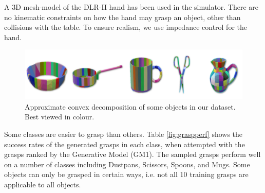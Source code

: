 A 3D mesh-model of the DLR-II hand has been used in the simulator. There are no kinematic constraints on how the hand may grasp an object, other than collisions with the table. To ensure realism, we use impedance control for the hand.
\begin{figure}
  \includegraphics[width=\linewidth]{images/decomposition.png}
  \caption{Approximate convex decomposition of some objects in our dataset. Best viewed in colour.}
  \label{fig:objectDecomposition}
\end{figure}

Some classes are easier to grasp than others. Table \ref{fig:graspperf} shows the success rates of the generated grasps in each class, when attempted with the grasps ranked by the Generative Model (GM1). The sampled grasps perform well on a number of classes including Dustpans, Scissors, Spoons, and Mugs. Some objects can only be grasped in certain ways, i.e. not all 10 training grasps are applicable to all objects.

